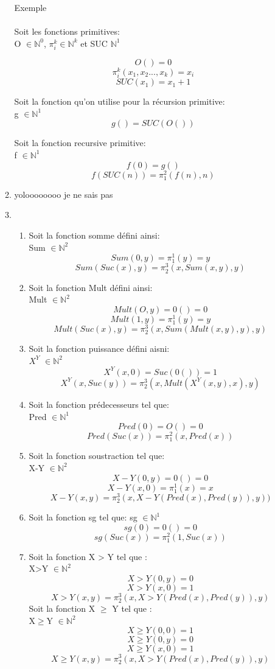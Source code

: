 \documentclass{article}
\begin{document}
\begin{enumerate}
\begin{enumerate}
  Exemple\\ \\
Soit les fonctions primitives: \\
O $\in \mathbb{N}^0$, $\pi_i^k \in \mathbb{N}^k$ et SUC $\mathbb{N}^1$ 

 \[O() = 0 \] 
\[\pi_i^k(x_1,x_2...,x_k) = x_i \] 
\[SUC(x_1) = x_1 + 1 \] 

Soit la fonction qu'on utilise pour la récursion primitive:\\
g $\in \mathbb{N}^1$
\[g() = SUC(O()) \]

Soit la fonction recursive primitive:\\
f $\in \mathbb{N}^1$
\[f(0) = g()\]
\[f(SUC(n)) = \pi_1^2(f(n),n)\]
  
\item  yoloooooooo je ne sais pas 
\item \begin{enumerate}\item Soit la fonction somme défini ainsi:\\
 Sum $\in \mathbb{N}^2$ 
\[Sum(0,y) = \pi_1^1(y) = y \]
\[Sum(Suc(x),y) = \pi_2^3(x,Sum(x,y),y)\]
\item Soit la fonction Mult défini ainsi: \\
Mult $\in \mathbb{N}^2$
\[Mult(O,y) = 0() = 0\]
\[Mult(1,y) = \pi_1^1(y) = y\]
\[Mult(Suc(x),y) = \pi_2^3(x,Sum(Mult(x,y),y),y)\]
\item Soit la fonction puissance défini aisni:\\
 $X^Y$ $\in \mathbb{N}^2$
\[X^Y(x,0) = Suc(0()) = 1\]
\[X^Y(x,Suc(y)) = \pi_2^3(x,Mult(X^Y(x,y),x),y)\]
\item Soit la fonction prédecesseurs tel que: \\
Pred $\in \mathbb{N}^1$
\[Pred(0) = O() = 0\]
\[Pred(Suc(x)) = \pi_1^2(x,Pred(x))\]
\item Soit la fonction soustraction tel que:\\
X-Y $\in \mathbb{N}^2$
\[X-Y(0,y) = 0() = 0\]
\[X-Y(x,0) = \pi_1^1(x) = x\]
\[X-Y(x,y) = \pi_2^3(x,X-Y(Pred(x),Pred(y)),y))\]
\item Soit la fonction sg tel que:
sg $\in \mathbb{N}^1$
\[sg(0) = 0() = 0\]
\[sg(Suc(x)) = \pi_1^2(1,Suc(x))\]
\item Soit la fonction X > Y tel que :\\
X>Y $\in \mathbb{N}^2$
\[X>Y(0,y) = 0\]
\[X>Y(x,0) = 1\]
\[X>Y(x,y) = \pi_2^3(x,X>Y(Pred(x),Pred(y)),y)\]
Soit la fonction X $\ge$ Y tel que :\\
X$\ge$Y $\in \mathbb{N}^2$
\[X\ge Y(0,0) = 1\]
\[X\ge Y(0,y) = 0\]
\[X\ge Y(x,0) = 1\]
\[X\ge Y(x,y) = \pi_2^3(x,X>Y(Pred(x),Pred(y)),y)\]


\end{enumerate}
\end{enumerate}
\end{enumerate}
\end{document}
